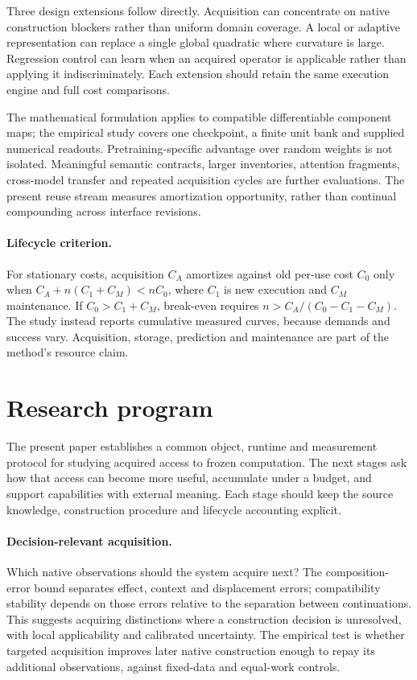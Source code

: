 \documentclass[11pt]{article}
\begin{document}
Three design extensions follow directly. Acquisition can concentrate on native
construction blockers rather than uniform domain coverage. A local or adaptive
representation can replace a single global quadratic where curvature is large.
Regression control can learn when an acquired operator is applicable rather
than applying it indiscriminately. Each extension should retain the same
execution engine and full cost comparisons.

The mathematical formulation applies to compatible differentiable component
maps; the empirical study covers one checkpoint, a finite unit bank and supplied
numerical readouts. Pretraining-specific advantage over random weights is not
isolated. Meaningful semantic contracts, larger inventories, attention fragments,
cross-model transfer and repeated acquisition cycles are further evaluations.
The present reuse stream measures amortization opportunity, rather than continual
compounding across interface revisions.

\paragraph{Lifecycle criterion.}
For stationary costs, acquisition $C_A$ amortizes against old per-use cost $C_0$
only when $C_A+n(C_1+C_M)<nC_0$, where $C_1$ is new execution and $C_M$
maintenance. If $C_0>C_1+C_M$, break-even requires
$n>C_A/(C_0-C_1-C_M)$. The study instead reports cumulative measured curves,
because demands and success vary. Acquisition, storage, prediction and
maintenance are part of the method's resource claim.

\section{Research program}
The present paper establishes a common object, runtime and measurement protocol
for studying acquired access to frozen computation. The next stages ask how
that access can become more useful, accumulate under a budget, and support
capabilities with external meaning. Each stage should keep the source knowledge,
construction procedure and lifecycle accounting explicit.

\paragraph{Decision-relevant acquisition.}
Which native observations should the system acquire next? The composition-error
bound separates effect, context and displacement errors; compatibility stability
depends on those errors relative to the separation between continuations. This
suggests acquiring distinctions where a construction decision is unresolved,
with local applicability and calibrated uncertainty. The empirical test is
whether targeted acquisition improves later native construction enough to
repay its additional observations, against fixed-data and equal-work controls.
\end{document}

